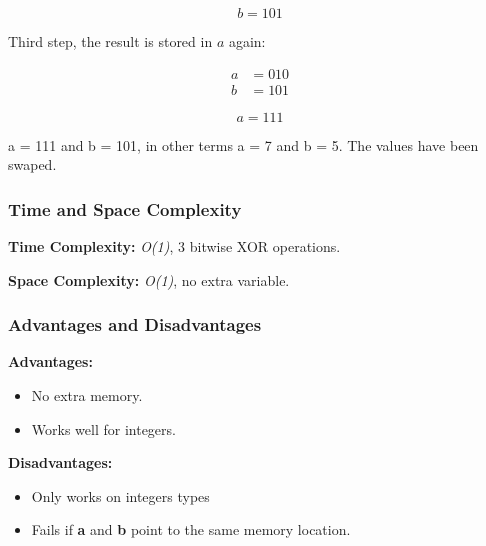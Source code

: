 \[\boxed{
  b = 101
}\]

Third step, the result is stored in $a$ again:

\begin{align*}
  a &= 010 \\
  b &= 101
\end{align*}

\[\boxed{
  a = 111
}\]

a = 111 and b = 101, in other terms a = 7 and b = 5. The values have been swaped.

\subsubsection*{Time and Space Complexity}

\textbf{Time Complexity:} \textit{O(1)}, 3 bitwise XOR operations.

\textbf{Space Complexity:} \textit{O(1)}, no extra variable.

\subsubsection*{Advantages and Disadvantages}

\textbf{Advantages:}

\begin{itemize}
  \item No extra memory.
  \item Works well for integers.
\end{itemize}

\textbf{Disadvantages:}

\begin{itemize}
  \item Only works on integers types
  \item Fails if \textbf{a} and \textbf{b} point to the same memory location.
\end{itemize}
